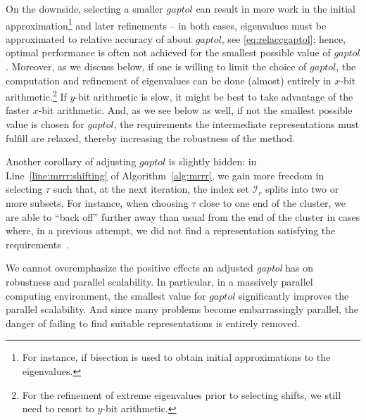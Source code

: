 \documentclass[final]{siamltex}
\begin{document}
On the downside, selecting a smaller $gaptol$ can result in more work in the
initial approximation\footnote{For instance, if bisection is used to obtain
  initial approximations to the eigenvalues.} and later refinements -- in
both cases, eigenvalues must be approximated to relative accuracy of about $gaptol$, see
\eqref{eq:relaccgaptol}; hence, optimal performance is often not achieved
for the smallest possible value of $gaptol$. 
Moreover, as we discuss below, if one is willing to limit
the choice of $gaptol$, the computation and refinement of eigenvalues can be
done (almost) entirely in $x$-bit arithmetic.\footnote{For the refinement of extreme
  eigenvalues prior to selecting shifts, we still need to resort to
  $y$-bit arithmetic.} If $y$-bit arithmetic is slow, it might be best to
take advantage of the faster $x$-bit arithmetic. And, as we see below as
well, if not the smallest possible value is chosen for $gaptol$, the
requirements the intermediate 
representations must fulfill are relaxed, thereby increasing the robustness
of the method.  

Another corollary of adjusting $gaptol$ is slightly hidden: in
Line~\ref{line:mrrr:shifting} of Algorithm~\ref{alg:mrrr}, we gain more freedom
in selecting $\tau$ such
that, at the next iteration, the index set 
$\mathcal{I}_r$ splits into two or more subsets. For instance, when choosing
$\tau$ close to one end of the cluster, we are able to ``back off'' further
away than usual from the end of the cluster in cases where, in a previous
attempt, we did not find a representation satisfying the requirements~\cite{DesignMRRR}. 

We cannot overemphasize the positive effects an adjusted {\em gaptol} has on
robustness and parallel scalability. In particular, in a massively parallel
computing environment, the smallest value for $gaptol$ significantly
improves the parallel scalability. And since many problems become embarrassingly
parallel, the danger of failing to find suitable representations is entirely
removed. 
\end{document}

